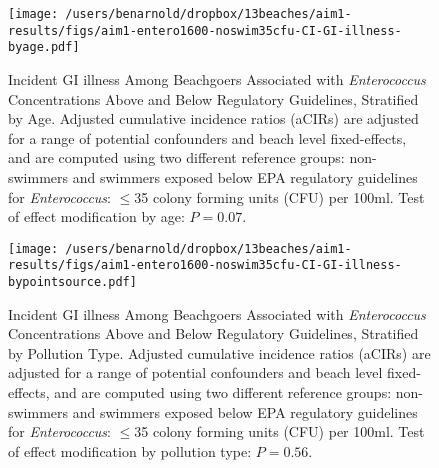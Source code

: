 \documentclass[12pt]{article}\usepackage[]{graphicx}\usepackage[]{color}
\begin{document}
\begin{landscape}
\begin{figure}[htbp]
\begin{center}
\texttt{[image: /users/benarnold/dropbox/13beaches/aim1-results/figs/aim1-entero1600-noswim35cfu-CI-GI-illness-byage.pdf]}
\begin{minipage}{1.2\textwidth}
\caption{Incident GI illness Among Beachgoers Associated with \textit{Enterococcus} Concentrations Above and Below Regulatory Guidelines, Stratified by Age. Adjusted cumulative incidence ratios (aCIRs) are adjusted for a range of potential confounders and beach level fixed-effects, and are computed using two different reference groups: non-swimmers and swimmers exposed below EPA regulatory guidelines for \textit{Enterococcus}: $\leq$35 colony forming units (CFU) per 100ml. Test of effect modification by age: $P=0.07$.}
\label{fig:GIentero35age}
\end{minipage}
\end{center}
\end{figure}
\end{landscape}

\begin{figure}[htbp]
\begin{center}
\texttt{[image: /users/benarnold/dropbox/13beaches/aim1-results/figs/aim1-entero1600-noswim35cfu-CI-GI-illness-bypointsource.pdf]}
\begin{minipage}{1\textwidth}
\caption{Incident GI illness Among Beachgoers Associated with \textit{Enterococcus} Concentrations Above and Below Regulatory Guidelines, Stratified by Pollution Type. Adjusted cumulative incidence ratios (aCIRs) are adjusted for a range of potential confounders and beach level fixed-effects, and are computed using two different reference groups: non-swimmers and swimmers exposed below EPA regulatory guidelines for \textit{Enterococcus}: $\leq$35 colony forming units (CFU) per 100ml. Test of effect modification by pollution type: $P=0.56$.}
\label{fig:GIentero35pol}
\end{minipage}
\end{center}
\end{figure}
\end{document}
